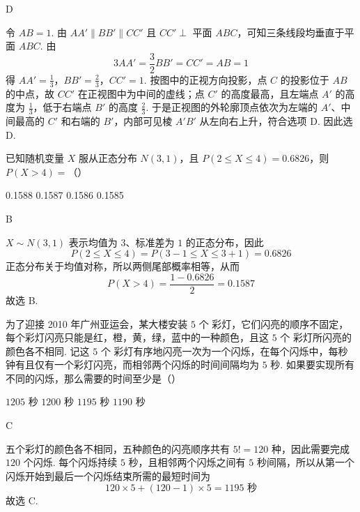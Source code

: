 \begin{answer}
D
\end{answer}

\begin{solution}
令 \(AB=1\). 由 \(AA'\parallel BB'\parallel CC'\) 且 \(CC'\perp\) 平面 \(ABC\)，可知三条线段均垂直于平面 \(ABC\). 由
\[
3AA'=\frac32BB'=CC'=AB=1
\]
得
\(AA'=\frac13\)，\(BB'=\frac23\)，\(CC'=1\).
按图中的正视方向投影，点 \(C\) 的投影位于 \(AB\) 的中点，故 \(CC'\) 在正视图中为中间的虚线；点 \(C'\) 的高度最高，且左端点 \(A'\) 的高度为 \(\frac13\)，低于右端点 \(B'\) 的高度 \(\frac23\). 于是正视图的外轮廓顶点依次为左端的 \(A'\)、中间最高的 \(C'\) 和右端的 \(B'\)，内部可见棱 \(A'B'\) 从左向右上升，符合选项 D. 因此选 D.
\end{solution}

\begin{problem}
已知随机变量 \(X\) 服从正态分布 \( N(3,1) \)，且 \( P(2 \leqslant X \leqslant 4) = 0.6826 \)，则 \( P(X > 4) = \)（\quad）

\choices
    {0.1588}
    {0.1587}
    {0.1586}
    {0.1585}
\end{problem}

\begin{answer}
B
\end{answer}

\begin{solution}
\(X\sim N(3,1)\) 表示均值为 \(3\)、标准差为 \(1\) 的正态分布，因此
\[
P(2\leqslant X\leqslant4)=P(3-1\leqslant X\leqslant3+1)=0.6826
\]
正态分布关于均值对称，所以两侧尾部概率相等，从而
\[
P(X>4)=\frac{1-0.6826}{2}=0.1587
\]
故选 B.
\end{solution}

\begin{problem}
为了迎接 2010 年广州亚运会，某大楼安装 \(5\text{ 个}\) 彩灯，它们闪亮的顺序不固定，每个彩灯闪亮只能是红，橙，黄，绿，蓝中的一种颜色，且这 \(5\text{ 个}\) 彩灯所闪亮的颜色各不相同. 记这 \(5\text{ 个}\) 彩灯有序地闪亮一次为一个闪烁，在每个闪烁中，每秒钟有且仅有一个彩灯闪亮，而相邻两个闪烁的时间间隔均为 \(5\text{ 秒}\). 如果要实现所有不同的闪烁，那么需要的时间至少是（\quad）

\choices
    {\(1205\text{ 秒}\)}
    {\(1200\text{ 秒}\)}
    {\(1195\text{ 秒}\)}
    {\(1190\text{ 秒}\)}
\end{problem}

\begin{answer}
C
\end{answer}

\begin{solution}
五个彩灯的颜色各不相同，五种颜色的闪亮顺序共有 \(5!=120\) 种，因此需要完成 \(120\) 个闪烁. 每个闪烁持续 \(5\) 秒，且相邻两个闪烁之间有 \(5\) 秒间隔，所以从第一个闪烁开始到最后一个闪烁结束所需的最短时间为
\[
120\times5+(120-1)\times5=1195\text{ 秒}
\]
故选 C.
\end{solution}

